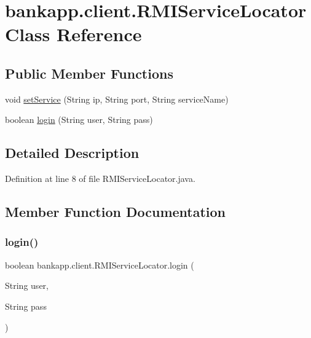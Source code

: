 \hypertarget{classbankapp_1_1client_1_1_r_m_i_service_locator}{}\section{bankapp.\+client.\+R\+M\+I\+Service\+Locator Class Reference}
\label{classbankapp_1_1client_1_1_r_m_i_service_locator}
\subsection*{Public Member Functions}
\begin{DoxyCompactItemize}
\item 
void \hyperlink{classbankapp_1_1client_1_1_r_m_i_service_locator_a9a1605fa6be3933008e90db56b804007}{set\+Service} (String ip, String port, String service\+Name)
\item 
boolean \hyperlink{classbankapp_1_1client_1_1_r_m_i_service_locator_a2287058ad6e7eaa5b38303c02102d740}{login} (String user, String pass)
\end{DoxyCompactItemize}


\subsection{Detailed Description}


Definition at line 8 of file R\+M\+I\+Service\+Locator.\+java.



\subsection{Member Function Documentation}
\mbox{\label{classbankapp_1_1client_1_1_r_m_i_service_locator_a2287058ad6e7eaa5b38303c02102d740}} 
\subsubsection{\texorpdfstring{login()}{login()}}
{\footnotesize\ttfamily boolean bankapp.\+client.\+R\+M\+I\+Service\+Locator.\+login (\begin{DoxyParamCaption}\item[{String}]{user,  }\item[{String}]{pass }\end{DoxyParamCaption})}



